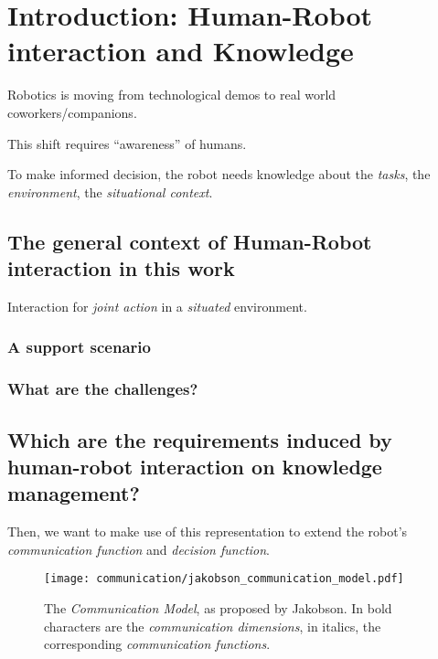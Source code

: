 \chapter{Introduction: Human-Robot interaction and Knowledge}
\label{chapter|introduction}

Robotics is moving from technological demos to real world coworkers/companions.

This shift requires ``awareness'' of humans.

To make informed decision, the robot needs knowledge about the \emph{tasks},
the \emph{environment}, the \emph{situational context}.

\section{The general context of Human-Robot interaction in this work}
\label{sect|general-context}

Interaction for \emph{joint action} in a \emph{situated} environment.

\subsection{A support scenario}
\label{sect|scenario}



\subsection{What are the challenges?}
\label{sect|scenario-challenges}


\section{Which are the requirements induced by human-robot interaction on knowledge management?}
\label{sect|krs-requirements-hri}

Then, we want to make use of this representation to extend the robot's
\emph{communication function} and \emph{decision function}.

\begin{figure}%
\centering
  \texttt{[image: communication/jakobson\_communication\_model.pdf]}
  \caption{The \emph{Communication Model}, as proposed by Jakobson. In bold
  characters are the \emph{communication dimensions}, in italics, the
  corresponding \emph{communication functions}.}
  \label{fig|jakobson_communication_model}
\end{figure}

